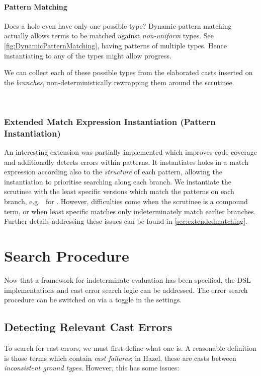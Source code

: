 \paragraph{Pattern Matching}
\label{sec:PatternMatching}
Does a hole even have only one possible type? Dynamic pattern matching actually allows terms to be matched against \textit{non-uniform} types. See \cref{fig:DynamicPatternMatching}, having patterns of multiple types. Hence instantiating to any of the types might allow progress.

We can collect each of these possible types from the elaborated casts inserted on the \textit{branches}, non-deterministically rewrapping them around the scrutinee.
\ 
\par
\ 
\par
\subsubsection{Extended Match Expression Instantiation (Pattern Instantiation)}
\label{sec:ExtendedPatternMatching}
An interesting extension was partially implemented which improves code coverage and additionally detects errors within patterns. It instantiates holes in a match expression according also to the \textit{structure} of each pattern, allowing the instantiation to prioritise searching along each branch. We instantiate the scrutinee with the least specific versions which match the patterns on each branch, e.g. \dyn\code{::}\dyn\ for . However, difficulties come when the scrutinee is a compound term, or when least specific matches only indeterminately match earlier branches. Further details addressing these issues can be found in \cref{sec:extendedmatching}.

\section{Search Procedure}\label{sec:SearchProcedure}
Now that a framework for indeterminate evaluation has been specified, the DSL implementations and cast error search logic can be addressed. The error search procedure can be switched on via a toggle in the settings.

\subsection{Detecting Relevant Cast Errors}
\label{sec:CastFailureDetection}
To search for cast errors, we must first define what one is. A reasonable definition is those terms which contain \textit{cast failures}; in Hazel, these are casts between \textit{inconsistent ground types}. However, this has some issues:

